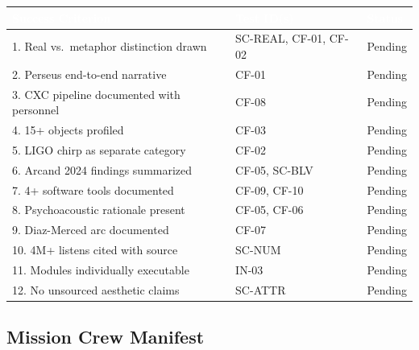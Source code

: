 \documentclass[11pt,letterpaper]{article}
\newcommand{\tableheader}[1]{\textbf{\sffamily\textcolor{white}{#1}}}
\begin{document}
\begin{center}
\begin{tabularx}{\textwidth}{XL{3.5cm}C{1.5cm}}
\toprule
{}
\tableheader{Success Criterion} & \tableheader{Test ID(s)} & \tableheader{Status} \\
. Real vs.\ metaphor distinction drawn & SC-REAL, CF-01, CF-02 & Pending \\
2. Perseus end-to-end narrative & CF-01 & Pending \\
3. CXC pipeline documented with personnel & CF-08 & Pending \\
4. 15+ objects profiled & CF-03 & Pending \\
5. LIGO chirp as separate category & CF-02 & Pending \\
6. Arcand 2024 findings summarized & CF-05, SC-BLV & Pending \\
7. 4+ software tools documented & CF-09, CF-10 & Pending \\
8. Psychoacoustic rationale present & CF-05, CF-06 & Pending \\
9. Diaz-Merced arc documented & CF-07 & Pending \\
10. 4M+ listens cited with source & SC-NUM & Pending \\
11. Modules individually executable & IN-03 & Pending \\
12. No unsourced aesthetic claims & SC-ATTR & Pending \\
\bottomrule
\end{tabularx}
\end{center}

\subsection{Mission Crew Manifest}
\end{document}

